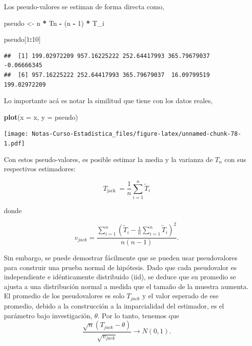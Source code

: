 \documentclass[
  12pt,
]{book}
\newenvironment{Shaded}{\begin{snugshade}}{\end{snugshade}}
\newcommand{\DataTypeTok}[1]{\textcolor[rgb]{0.13,0.29,0.53}{#1}}
\newcommand{\DecValTok}[1]{\textcolor[rgb]{0.00,0.00,0.81}{#1}}
\newcommand{\KeywordTok}[1]{\textcolor[rgb]{0.13,0.29,0.53}{\textbf{#1}}}
\newcommand{\NormalTok}[1]{#1}
\newcommand{\OperatorTok}[1]{\textcolor[rgb]{0.81,0.36,0.00}{\textbf{#1}}}
\newcommand{\StringTok}[1]{\textcolor[rgb]{0.31,0.60,0.02}{#1}}
\theoremstyle{definition}
\theoremstyle{definition}
\theoremstyle{definition}
\theoremstyle{remark}
\let\BeginKnitrBlock\begin \let\EndKnitrBlock\end
\begin{document}
\BeginKnitrBlock{exercise}
\protect\hypertarget{exr:unnamed-chunk-76}{}{\label{exr:unnamed-chunk-76} }Los pseudo-valores se estiman de forma directa como,
\EndKnitrBlock{exercise}

\begin{Shaded}
\begin{Highlighting}[]
\NormalTok{pseudo <-}\StringTok{ }\NormalTok{n }\OperatorTok{*}\StringTok{ }\NormalTok{Tn }\OperatorTok{-}\StringTok{ }\NormalTok{(n }\OperatorTok{-}\StringTok{ }\DecValTok{1}\NormalTok{) }\OperatorTok{*}\StringTok{ }\NormalTok{T_i}

\NormalTok{pseudo[}\DecValTok{1}\OperatorTok{:}\DecValTok{10}\NormalTok{]}
\end{Highlighting}
\end{Shaded}

\begin{verbatim}
##  [1] 199.02972209 957.16225222 252.64417993 365.79679037  -0.06666345
##  [6] 957.16225222 252.64417993 365.79679037  16.09799519 199.02972209
\end{verbatim}

Lo importante acá es notar la similitud que tiene con los datos
reales,

\begin{Shaded}
\begin{Highlighting}[]
\KeywordTok{plot}\NormalTok{(}\DataTypeTok{x =}\NormalTok{ x, }\DataTypeTok{y =}\NormalTok{ pseudo)}
\end{Highlighting}
\end{Shaded}

\texttt{[image: Notas-Curso-Estadistica\_files/figure-latex/unnamed-chunk-78-1.pdf]}

Con estos pseudo-valores, es posible estimar la media y la varianza de
\(T_{n}\) con sus respectivos estimadores:

\[
T_{\text {jack }}=\frac{1}{n} \sum_{i=1}^{n} \widetilde{T}_{i}
\]

donde

\[
v_{jack}=\frac{\sum_{i=1}^{n}\left(\widetilde{T}_{i}-\frac{1}{n}
\sum_{i=1}^{n} \widetilde{T}_{i}\right)^{2}}{n(n-1)}.
\]

\BeginKnitrBlock{remark}
{}
Sin embargo, se puede demostrar fácilmente que se pueden usar
pseudovalores para construir una prueba normal de hipótesis. Dado que
cada pseudovalor es independiente e idénticamente distribuido (iid),
se deduce que su promedio se ajusta a una distribución normal a medida
que el tamaño de la muestra aumenta. El promedio de los pseudovalores
es solo \(T_ {jack}\) y el valor esperado de ese promedio, debido a la
construcción a la imparcialidad del estimador, es el parámetro bajo
investigación, \(\theta\). Por lo tanto, tenemos que
\[
  \frac{\sqrt{n}\left(T_{jack}-\theta\right)}{\sqrt{v_{jack}}}
  \rightarrow N(0,1).
\]
\EndKnitrBlock{remark}
\end{document}
